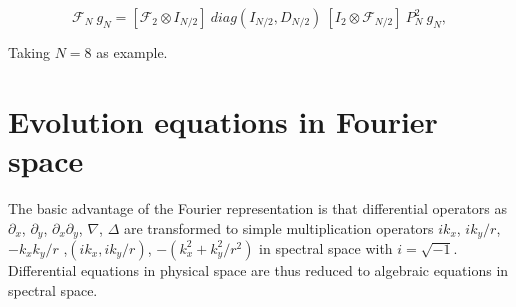 \begin{equation} \label{eq_FNFNr2_02} 
 \mathcal{F}_{N} \ g_{N} 
   = 
 \left[ \mathcal{F}_{2} \otimes I_{N/2} \right] \ 
 diag(I_{N/2},D_{N/2})  \ 
 \left[ I_{2} \otimes \mathcal{F}_{N/2} \right] \
 P_{N}^{2} \ g_{N},
\end{equation}

Taking $N=8$ as example.
 




\section{Evolution equations in Fourier space}
\label{ssec_evolfourier}
The basic advantage of the Fourier representation is that
differential operators as $\partial_{x}$,
$\partial_{y}$, $\partial_{x} \partial_{y}$, $\nabla$, $\Delta$
are transformed to simple multiplication operators
$i k_{x}$, $i k_{y}/r$, $- k_{x} k_{y}/r$ ,$(i k_{x},i k_{y}/r)$, 
$-(k_{x}^{2} + k_{y}^{2}/r^{2})$ in spectral space with $i = \sqrt{-1}$.
Differential equations in physical space are thus reduced to algebraic 
equations in spectral space.

